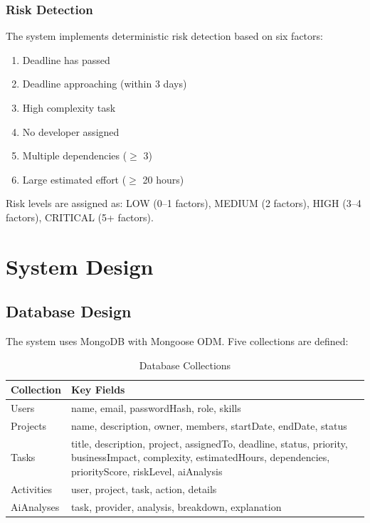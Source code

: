 \documentclass[12pt,a4paper,oneside]{report}
\begin{document}
\subsection{Risk Detection}

The system implements deterministic risk detection based on six factors:
\begin{enumerate}[noitemsep]
  \item Deadline has passed
  \item Deadline approaching (within 3 days)
  \item High complexity task
  \item No developer assigned
  \item Multiple dependencies ($\geq$ 3)
  \item Large estimated effort ($\geq$ 20 hours)
\end{enumerate}

Risk levels are assigned as: LOW (0--1 factors), MEDIUM (2 factors), HIGH (3--4 factors), CRITICAL (5+ factors).


\chapter{System Design}

\section{Database Design}

The system uses MongoDB with Mongoose ODM. Five collections are defined:

\begin{table}[H]
\centering
\caption{Database Collections}
\label{tab:collections}
\begin{tabular}{|l|p{9cm}|}
\hline
\textbf{Collection} & \textbf{Key Fields} \\
\hline
Users       & name, email, passwordHash, role, skills \\
\hline
Projects    & name, description, owner, members, startDate, endDate, status \\
\hline
Tasks       & title, description, project, assignedTo, deadline, status, priority, businessImpact, complexity, estimatedHours, dependencies, priorityScore, riskLevel, aiAnalysis \\
\hline
Activities  & user, project, task, action, details \\
\hline
AiAnalyses  & task, provider, analysis, breakdown, explanation \\
\hline
\end{tabular}
\end{table}
\end{document}
